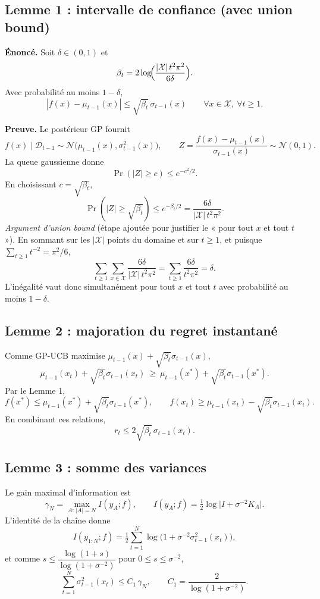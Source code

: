 \documentclass[12pt]{article}
\newcommand{\N}{\mathcal{N}}
\newcommand{\X}{\mathcal{X}}
\newcommand{\D}{\mathcal{D}}
\newcommand{\K}{K}
\newcommand{\xs}{x^{*}}
\begin{document}
\subsection*{Lemme 1 : intervalle de confiance (avec union bound)}

\textbf{Énoncé.} Soit $\delta\in(0,1)$ et
\[
\beta_t = 2\log\!\Bigl(\frac{|\X|\,t^2\pi^2}{6\delta}\Bigr).
\]
Avec probabilité au moins $1-\delta$,
\[
\boxed{\, |f(x) - \mu_{t-1}(x)| \le \sqrt{\beta_t}\,\sigma_{t-1}(x)
\qquad \forall x \in \X,\ \forall t \ge 1. \,}
\]

\textbf{Preuve.} Le postérieur GP fournit
\[
f(x) \mid \D_{t-1} \sim \N\bigl(\mu_{t-1}(x), \sigma_{t-1}^2(x)\bigr),
\qquad
Z = \frac{f(x) - \mu_{t-1}(x)}{\sigma_{t-1}(x)} \sim \N(0,1).
\]
La queue gaussienne donne
\[
\Pr(|Z| \ge c) \le e^{-c^2/2}.
\]
En choisissant $c=\sqrt{\beta_t}$,
\[
\Pr(|Z| \ge \sqrt{\beta_t}) \le e^{-\beta_t/2} = \frac{6\delta}{|\X|\,t^2\pi^2}.
\]
\emph{Argument d'union bound} (étape ajoutée pour justifier le « pour tout $x$ et
tout $t$ »). En sommant sur les $|\X|$ points du domaine et sur $t\ge1$, et
puisque $\sum_{t\ge1} t^{-2} = \pi^2/6$,
\[
\sum_{t\ge1}\sum_{x\in\X} \frac{6\delta}{|\X|\,t^2\pi^2}
= \sum_{t\ge1} \frac{6\delta}{t^2\pi^2}
= \delta.
\]
L'inégalité vaut donc simultanément pour tout $x$ et tout $t$ avec probabilité au
moins $1-\delta$.

\subsection*{Lemme 2 : majoration du regret instantané}

Comme GP-UCB maximise $\mu_{t-1}(x) + \sqrt{\beta_t}\sigma_{t-1}(x)$,
\[
\mu_{t-1}(x_t) + \sqrt{\beta_t}\sigma_{t-1}(x_t)
\ \ge\
\mu_{t-1}(\xs) + \sqrt{\beta_t}\sigma_{t-1}(\xs).
\]
Par le Lemme 1,
\[
f(\xs) \le \mu_{t-1}(\xs) + \sqrt{\beta_t}\sigma_{t-1}(\xs),
\qquad
f(x_t) \ge \mu_{t-1}(x_t) - \sqrt{\beta_t}\sigma_{t-1}(x_t).
\]
En combinant ces relations,
\[
\boxed{\, r_t \le 2\sqrt{\beta_t}\,\sigma_{t-1}(x_t). \,}
\]

\subsection*{Lemme 3 : somme des variances}

Le gain maximal d'information est
\[
\gamma_N = \max_{A:\,|A|=N} I(y_A; f),
\qquad
I(y_A; f) = \tfrac12 \log\bigl| I + \sigma^{-2} \K_A \bigr|.
\]
L'identité de la chaîne donne
\[
I(y_{1:N}; f) = \tfrac12 \sum_{t=1}^N \log\!\bigl(1 + \sigma^{-2}\sigma_{t-1}^2(x_t)\bigr),
\]
et comme $s \le \dfrac{\log(1+s)}{\log(1+\sigma^{-2})}$ pour $0\le s\le\sigma^{-2}$,
\[
\boxed{\, \sum_{t=1}^N \sigma_{t-1}^2(x_t) \le C_1\,\gamma_N,
\qquad C_1 = \frac{2}{\log(1+\sigma^{-2})}. \,}
\]
\end{document}
